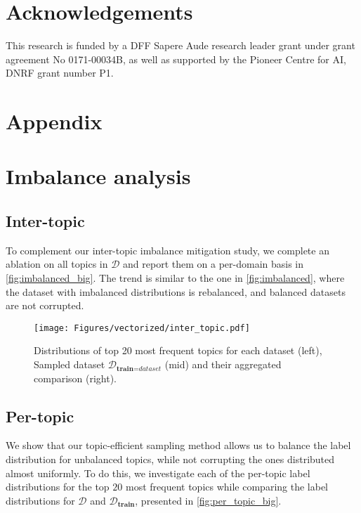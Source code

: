 \documentclass[11pt]{article}
\begin{document}
\label{sec:limitations}

\section*{Acknowledgements}

This research is funded by a DFF Sapere Aude research leader grant under grant agreement No 0171-00034B, as well as supported by the Pioneer Centre for AI, DNRF
grant number P1.




\clearpage
\appendix


\section*{Appendix}
\label{sec:Appendix}





\section{Imbalance analysis}
\label{Appendix:imbalances}

\subsection{Inter-topic}
\label{Appendix:inter_topic_analysis}

To complement our inter-topic imbalance mitigation study, we complete an ablation on all topics in $\mathcal{D}$ and report them on a per-domain basis in \autoref{fig:imbalanced_big}. The trend is similar to the one in \autoref{fig:imbalanced}, where the dataset with imbalanced distributions is rebalanced, and balanced datasets are not corrupted.

\begin{figure*}
\centering
\texttt{[image: Figures/vectorized/inter\_topic.pdf]}
\caption{Distributions of top 20 most frequent topics for each dataset (left), Sampled dataset $\mathcal{D}_{\textbf{train} = \textit{dataset}}$ (mid) and their aggregated comparison (right).
}
\label{fig:imbalanced_big}
\end{figure*}


\subsection{Per-topic}
\label{Appendix:per_topic_analysis}

We show that our topic-efficient sampling method allows us to balance the label distribution for unbalanced topics, while not corrupting the ones distributed almost uniformly. To do this, we investigate each of the per-topic label distributions for the top $20$ most frequent topics while comparing  the label distributions for $\mathcal{\mathcal{D}}$ and $\mathcal{D}_\textbf{train}$, presented in \autoref{fig:per_topic_big}.
\end{document}
